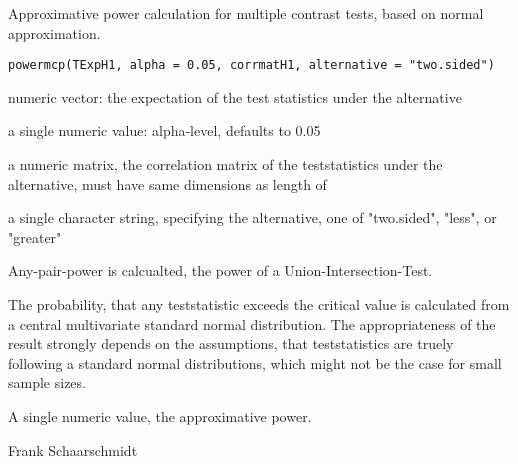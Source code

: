 \begin{Description}\relax
Approximative power calculation for multiple contrast tests, based on normal approximation.
\end{Description}
\begin{Usage}
\begin{verbatim}
powermcp(TExpH1, alpha = 0.05, corrmatH1, alternative = "two.sided")
\end{verbatim}
\end{Usage}
\begin{Arguments}
\begin{ldescription}
\item[\code{TExpH1}] numeric vector: the expectation of the test statistics under the alternative 
\item[\code{alpha}] a single numeric value: alpha-level, defaults to 0.05 
\item[\code{corrmatH1}] a numeric matrix, the correlation matrix of the teststatistics under the alternative, must have same dimensions as length of   
\item[\code{alternative}] a single character string, specifying the alternative, one of "two.sided", "less", or "greater"  
\end{ldescription}
\end{Arguments}
\begin{Details}\relax
Any-pair-power is calcualted, the power of a Union-Intersection-Test.

The probability, that any teststatistic exceeds the critical value is calculated from a central multivariate standard normal distribution.
The appropriateness of the result strongly depends on the assumptions, that teststatistics are truely following a standard normal distributions,
which might not be the case for small sample sizes.
\end{Details}
\begin{Value}
A single numeric value, the approximative power.
\end{Value}
\begin{Author}\relax
Frank Schaarschmidt
\end{Author}
\begin{Examples}
\begin{ExampleCode}
\end{ExampleCode}
\end{Examples}

